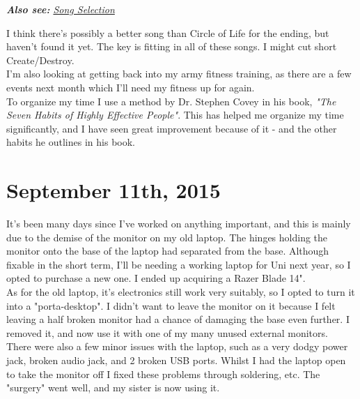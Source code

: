             \textit{\textbf{Also see: }\hyperref[audio_selection]{Song Selection}}
    		
    		I think there's possibly a better song than Circle of Life for the ending, but haven't found it yet. The key is fitting in all of these songs. I might cut short Create/Destroy.\\
    		
    		I'm also looking at getting back into my army fitness training, as there are a few events next month which I'll need my fitness up for again.\\
    		
    		To organize my time I use a method by Dr. Stephen Covey in his book, \textit{"The Seven Habits of Highly Effective People"}. This has helped me organize my time significantly, and I have seen great improvement because of it - and the other habits he outlines in his book.\\
    		
    	\section{September 11th, 2015}
    		It's been many days since I've worked on anything important, and this is mainly due to the demise of the monitor on my old laptop. The hinges holding the monitor onto the base of the laptop had separated from the base. Although fixable in the short term, I'll be needing a working laptop for Uni next year, so I opted to purchase a new one. I ended up acquiring a Razer Blade 14".\\
    		
    		As for the old laptop, it's electronics still work very suitably, so I opted to turn it into a "porta-desktop". I didn't want to leave the monitor on it because I felt leaving a half broken monitor had a chance of damaging the base even further. I removed it, and now use it with one of my many unused external monitors.\\
    		
    		There were also a few minor issues with the laptop, such as a very dodgy  power jack, broken audio jack, and 2 broken USB ports. Whilst I had the laptop open to take the monitor off I fixed these problems through soldering, etc. The "surgery" went well, and my sister is now using it.\\
    		
